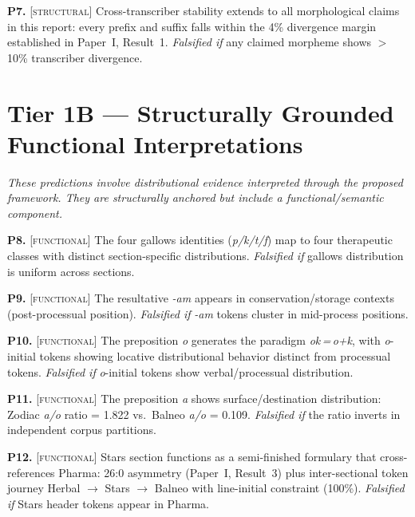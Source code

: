 \documentclass[11pt,a4paper]{article}
\newcommand{\structural}{\textsc{[structural]}}
\newcommand{\functional}{\textsc{[functional]}}
\newcommand{\falsmark}{\textit{Falsified if}}
\begin{document}
\medskip

\noindent\textbf{P7.} \structural{} Cross-transcriber stability extends to all morphological claims in this report: every prefix and suffix falls within the 4\% divergence margin established in Paper~I, Result~1. \falsmark{} any claimed morpheme shows $>$\,10\% transcriber divergence.

\section{Tier 1B --- Structurally Grounded Functional Interpretations}

\textit{These predictions involve distributional evidence interpreted through the proposed framework. They are structurally anchored but include a functional/semantic component.}

\medskip

\noindent\textbf{P8.} \functional{} The four gallows identities (\textit{p/k/t/f}) map to four therapeutic classes with distinct section-specific distributions. \falsmark{} gallows distribution is uniform across sections.

\medskip

\noindent\textbf{P9.} \functional{} The resultative \textit{-am} appears in conservation/storage contexts (post-processual position). \falsmark{} \textit{-am} tokens cluster in mid-process positions.

\medskip

\noindent\textbf{P10.} \functional{} The preposition \textit{o} generates the paradigm \textit{ok\,=\,o+k}, with \textit{o}-initial tokens showing locative distributional behavior distinct from processual tokens. \falsmark{} \textit{o}-initial tokens show verbal/processual distribution.

\medskip

\noindent\textbf{P11.} \functional{} The preposition \textit{a} shows surface/destination distribution: Zodiac \textit{a/o} ratio = 1.822 vs.\ Balneo \textit{a/o} = 0.109. \falsmark{} the ratio inverts in independent corpus partitions.

\medskip

\noindent\textbf{P12.} \functional{} Stars section functions as a semi-finished formulary that cross-references Pharma: 26:0 asymmetry (Paper~I, Result~3) plus inter-sectional token journey Herbal $\rightarrow$ Stars $\rightarrow$ Balneo with line-initial constraint (100\%). \falsmark{} Stars header tokens appear in Pharma.
\end{document}
